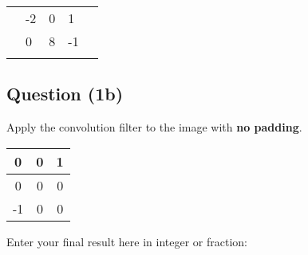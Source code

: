 \documentclass[12pt]{article}
\begin{document}
\begin{center}
\begin{tabular}{|l|l|l|l|l|}
\hline
\hspace{1mm} & \hspace{1mm} & \hspace{1mm} & \hspace{1mm} & \hspace{1mm} \\ \hline
\hspace{1mm} & \hspace{1mm}-2& \hspace{1mm}0& \hspace{1mm}1& \hspace{1mm} \\ \hline
\hspace{1mm} & \hspace{1mm}0& \hspace{1mm}8& \hspace{1mm}-1& \hspace{1mm} \\ \hline
\hspace{1mm} & \hspace{1mm} & \hspace{1mm} & \hspace{1mm} & \hspace{1mm} \\ \hline
\end{tabular}
\end{center}

\subsection*{Question (1b)} Apply the convolution filter to the image with \textbf{no padding}.
\begin{center}
\begin{tabular}{|c|c|c|}
\hline
0  & 0 & 1 \\ \hline
0  & 0 & 0 \\ \hline
-1 & 0 & 0 \\ \hline
\end{tabular}
\end{center}

\noindent Enter your final result here in integer or fraction:
\end{document}
